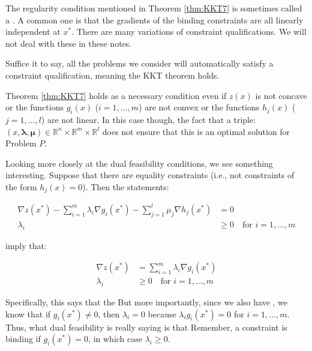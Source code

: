 \begin{remark} The regularity condition mentioned in Theorem \ref{thm:KKT7} is sometimes called a . A common one is that the gradients of the binding constraints are all linearly independent at ${x}^*$. There are many variations of constraint qualifications. We will not deal with these in these notes. 
    
    Suffice it to say, all the problems we consider will automatically satisfy a constraint qualification, meaning the KKT theorem holds.
\end{remark}

\begin{remark} Theorem \ref{thm:KKT7} holds as a necessary condition even if $z({x})$ is not concave or the functions $g_i({x})$ ($i=1,\dots,m$) are not convex or the functions $h_j({x})$ ($j=1,\dots,l$) are not linear. In this case though, the fact that a triple: $({x},\boldsymbol{\lambda}, \boldsymbol{\mu}) \in \mathbb{R}^{n} \times \mathbb{R}^m \times \mathbb{R}^l$ does not ensure that this is an optimal solution for Problem $P$.
\end{remark}

Looking more closely at the dual feasibility conditions, we see something interesting. Suppose that there are  equality constraints (i.e., not constraints of the form $h_j({x}) = 0$). Then the statements:

\begin{equation}
\begin{aligned}
\nabla z({x}^*) - \sum_{i = 1}^m\lambda_i \nabla g_i({x}^*) - \sum_{j = 1}^{l}\mu_j \nabla h_j({x}^*) & = {0}\\
\lambda_i &\geq 0 \quad \text{for $i=1,\dots,m$}
\end{aligned}
\end{equation}

imply that:

\begin{equation}
\begin{aligned}
\nabla z({x}^*) &= \sum_{i = 1}^m\lambda_i \nabla g_i({x}^*)\\
\lambda_i &\geq 0 \quad \text{for $i=1,\dots,m$}
\end{aligned}
\end{equation}

Specifically, this says that the  But more importantly, since we also have , we know that if ${g}_i({x}^*) \neq 0$, then $\lambda_i = 0$ because $\lambda_i g_i({x}^*) = 0$ for $i = 1,\dots,m$. Thus, what dual feasibility is really saying is that  Remember, a constraint is binding if $g_i({x}^*) = 0$, in which case $\lambda_i \geq 0$.


